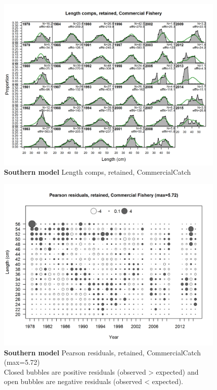 \documentclass[12pt,]{article}
\begin{document}
\begin{figure}[htbp]
\centering
\includegraphics{./r4ss/plots_mod2/comp_lenfit_flt2mkt2.png}
\caption{\textbf{Southern model} Length comps, retained, CommercialCatch
\label{fig:mod2_5_comp_lenfit_flt2mkt2}}
\end{figure}

\begin{figure}[htbp]
\centering
\includegraphics{./r4ss/plots_mod2/comp_lenfit_residsflt2mkt2.png}
\caption{\textbf{Southern model} Pearson residuals, retained,
CommercialCatch (max=5.72)\\
Closed bubbles are positive residuals (observed \textgreater{} expected)
and open bubbles are negative residuals (observed \textless{} expected).
\label{fig:mod2_6_comp_lenfit_residsflt2mkt2}}
\end{figure}
\end{document}
